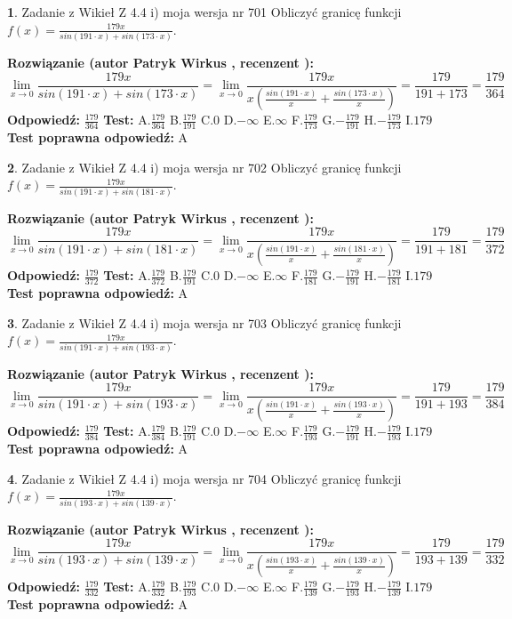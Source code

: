 \documentclass[12pt, a4paper]{article}
\theoremstyle{definition} %
\newtheorem{zad}{}
\newcommand{\zadStart}[1]{\begin{zad}#1\newline}
\newcommand{\zadStop}{\end{zad}}
\newcommand{\rozwStart}[2]{\noindent \textbf{Rozwiązanie (autor #1 , recenzent #2): }\newline}
\newcommand{\rozwStop}{\newline}
\newcommand{\odpStart}{\noindent \textbf{Odpowiedź:}\newline}
\newcommand{\odpStop}{\newline}
\newcommand{\testStart}{\noindent \textbf{Test:}\newline}
\newcommand{\testStop}{\newline}
\newcommand{\kluczStart}{\noindent \textbf{Test poprawna odpowiedź:}\newline}
\newcommand{\kluczStop}{\newline}
\begin{document}
\zadStart{Zadanie z Wikieł Z 4.4 i) moja wersja nr 701}
Obliczyć granicę funkcji $f(x)=\frac{179x}{sin(191\cdot x) +sin(173\cdot x)}$.
\zadStop
\rozwStart{Patryk Wirkus}{}
$$\lim\limits_{x\to 0}\frac{179x}{sin(191\cdot x) +sin(173\cdot x)}=\lim\limits_{x\to 0}\frac{179x}{x(\frac{sin(191\cdot x)}{x}+\frac{sin(173\cdot x)}{x})}=\frac{179}{191+173} = \frac{179}{364}$$
\rozwStop
\odpStart
$\frac{179}{364}$
\odpStop
\testStart
A.$\frac{179}{364}$
B.$\frac{179}{191}$
C.$0$
D.$-\infty$
E.$\infty$
F.$\frac{179}{173}$
G.$-\frac{179}{191}$
H.$-\frac{179}{173}$
I.$179$
\testStop
\kluczStart
A
\kluczStop



\zadStart{Zadanie z Wikieł Z 4.4 i) moja wersja nr 702}
Obliczyć granicę funkcji $f(x)=\frac{179x}{sin(191\cdot x) +sin(181\cdot x)}$.
\zadStop
\rozwStart{Patryk Wirkus}{}
$$\lim\limits_{x\to 0}\frac{179x}{sin(191\cdot x) +sin(181\cdot x)}=\lim\limits_{x\to 0}\frac{179x}{x(\frac{sin(191\cdot x)}{x}+\frac{sin(181\cdot x)}{x})}=\frac{179}{191+181} = \frac{179}{372}$$
\rozwStop
\odpStart
$\frac{179}{372}$
\odpStop
\testStart
A.$\frac{179}{372}$
B.$\frac{179}{191}$
C.$0$
D.$-\infty$
E.$\infty$
F.$\frac{179}{181}$
G.$-\frac{179}{191}$
H.$-\frac{179}{181}$
I.$179$
\testStop
\kluczStart
A
\kluczStop



\zadStart{Zadanie z Wikieł Z 4.4 i) moja wersja nr 703}
Obliczyć granicę funkcji $f(x)=\frac{179x}{sin(191\cdot x) +sin(193\cdot x)}$.
\zadStop
\rozwStart{Patryk Wirkus}{}
$$\lim\limits_{x\to 0}\frac{179x}{sin(191\cdot x) +sin(193\cdot x)}=\lim\limits_{x\to 0}\frac{179x}{x(\frac{sin(191\cdot x)}{x}+\frac{sin(193\cdot x)}{x})}=\frac{179}{191+193} = \frac{179}{384}$$
\rozwStop
\odpStart
$\frac{179}{384}$
\odpStop
\testStart
A.$\frac{179}{384}$
B.$\frac{179}{191}$
C.$0$
D.$-\infty$
E.$\infty$
F.$\frac{179}{193}$
G.$-\frac{179}{191}$
H.$-\frac{179}{193}$
I.$179$
\testStop
\kluczStart
A
\kluczStop



\zadStart{Zadanie z Wikieł Z 4.4 i) moja wersja nr 704}
Obliczyć granicę funkcji $f(x)=\frac{179x}{sin(193\cdot x) +sin(139\cdot x)}$.
\zadStop
\rozwStart{Patryk Wirkus}{}
$$\lim\limits_{x\to 0}\frac{179x}{sin(193\cdot x) +sin(139\cdot x)}=\lim\limits_{x\to 0}\frac{179x}{x(\frac{sin(193\cdot x)}{x}+\frac{sin(139\cdot x)}{x})}=\frac{179}{193+139} = \frac{179}{332}$$
\rozwStop
\odpStart
$\frac{179}{332}$
\odpStop
\testStart
A.$\frac{179}{332}$
B.$\frac{179}{193}$
C.$0$
D.$-\infty$
E.$\infty$
F.$\frac{179}{139}$
G.$-\frac{179}{193}$
H.$-\frac{179}{139}$
I.$179$
\testStop
\kluczStart
A
\kluczStop
\end{document}
